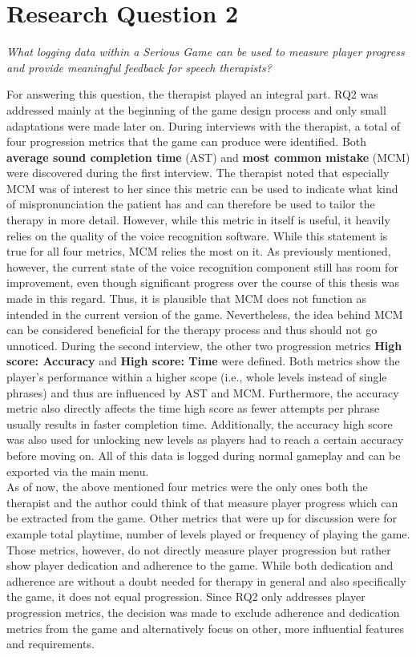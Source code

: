 \documentclass[draft,final]{vutinfth} %
\begin{document}
\section{Research Question 2}
\begin{center}
\emph{What logging data within a Serious Game can be used to measure player progress and provide meaningful feedback for speech therapists?}
\end{center} 

For answering this question, the therapist played an integral part. RQ2 was addressed mainly at the beginning of the game design process and only small adaptations were made later on. During interviews with the therapist, a total of four progression metrics that the game can produce were identified. Both \textbf{average sound completion time} (AST) and \textbf{most common mistake} (MCM) were discovered during the first interview. The therapist noted that especially MCM was of interest to her since this metric can be used to indicate what kind of mispronunciation the patient has and can therefore be used to tailor the therapy in more detail. However, while this metric in itself is useful, it heavily relies on the quality of the voice recognition software. While this statement is true for all four metrics, MCM relies the most on it. As previously mentioned, however, the current state of the voice recognition component still has room for improvement, even though significant progress over the course of this thesis was made in this regard. Thus, it is plausible that MCM does not function as intended in the current version of the game. Nevertheless, the idea behind MCM can be considered beneficial for the therapy process and thus should not go unnoticed. During the second interview, the other two progression metrics \textbf{High score: Accuracy} and \textbf{High score: Time} were defined. Both metrics show the player's performance within a higher scope (i.e., whole levels instead of single phrases) and thus are influenced by AST and MCM. Furthermore, the accuracy metric also directly affects the time high score as fewer attempts per phrase usually results in faster completion time. Additionally, the accuracy high score was also used for unlocking new levels as players had to reach a certain accuracy before moving on. All of this data is logged during normal gameplay and can be exported via the main menu. \\

As of now, the above mentioned four metrics were the only ones both the therapist and the author could think of that measure player progress which can be extracted from the game. Other metrics that were up for discussion were for example total playtime, number of levels played or frequency of playing the game. Those metrics, however, do not directly measure player progression but rather show player dedication and adherence to the game. While both dedication and adherence are without a doubt needed for therapy in general and also specifically the game, it does not equal progression. Since RQ2 only addresses player progression metrics, the decision was made to exclude adherence and dedication metrics from the game and alternatively focus on other, more influential features and requirements.
\end{document}
